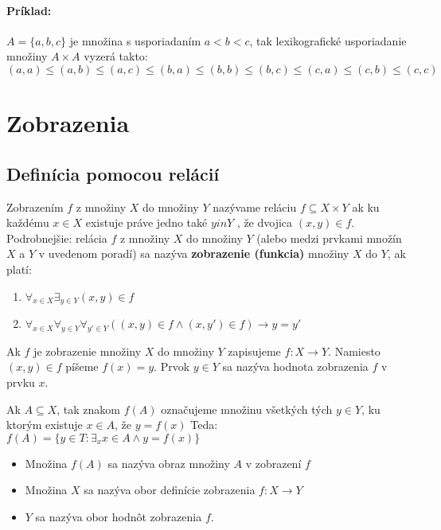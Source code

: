 		\paragraph{Príklad: }
		$A = \{a,b,c\}$ je množina s usporiadaním $a < b < c $, tak lexikografické usporiadanie množiny $A \times A$ vyzerá takto: $(a,a) \leq ( a,b) \leq ( a,c) \leq (b,a) \leq (b,b) \leq (b,c) \leq ( c,a) \leq ( c,b) \leq ( c,c)$

\section{Zobrazenia}

	\subsection*{Definícia pomocou relácií} 

		Zobrazením $f$ z množiny $X$ do množiny $Y$ nazývame reláciu $f \subseteq X \times Y$ ak ku každému $x \in X$ existuje práve jedno také $y in Y$ , že dvojica $( x, y ) \in f$.\\

		Podrobnejšie: relácia $f$ z množiny $X$ do množiny $Y$ (alebo medzi prvkami množín $X$ a $Y$ v uvedenom poradí) sa nazýva \textbf{zobrazenie (funkcia)} množiny $X$ do $Y$, ak platí:
		\begin{enumerate}
			\item $\forall_{x \in X} \exists_{y \in Y} (x, y) \in f $
			\item $\forall_{x \in X} \forall_{y \in Y} \forall_{y' \in Y} ((x, y) \in f \wedge (x, y') \in f ) \rightarrow y = y'$
		\end{enumerate}





		Ak $f$ je zobrazenie množiny $X$ do množiny $Y$ zapisujeme $f : X \rightarrow Y$. 
		Namiesto $( x, y) \in f$ píšeme $ f( x) = y $. Prvok $ y \in Y $ sa nazýva hodnota zobrazenia $f$ v prvku $x$.

		Ak $A \subseteq X$, tak znakom $f ( A)$ označujeme množinu všetkých tých $y \in Y$, ku ktorým existuje $x \in A$, že $y = f ( x)$ Teda: 
		$f(A) = \{y \in T: \exists_{x}x \in A \wedge y = f(x) \}$\\

		\begin{itemize}
			\item Množina $f ( A)$ sa nazýva obraz množiny $A$ v zobrazení $f$
			\item Množina $X$ sa nazýva obor definície zobrazenia $f : X \rightarrow Y$
			\item $Y$ sa nazýva obor hodnôt zobrazenia $f$.
		\end{itemize}

